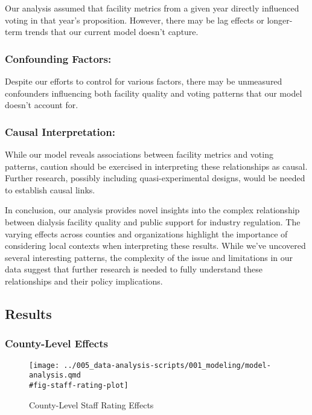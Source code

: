 \documentclass[
  11pt,
  letterpaper,
  DIV=11,
  numbers=noendperiod]{scrartcl}
\begin{document}
Our analysis assumed that facility metrics from a given year directly
influenced voting in that year's proposition. However, there may be lag
effects or longer-term trends that our current model doesn't capture.

\subsubsection{Confounding Factors:}\label{confounding-factors}

Despite our efforts to control for various factors, there may be
unmeasured confounders influencing both facility quality and voting
patterns that our model doesn't account for.

\subsubsection{Causal Interpretation:}\label{causal-interpretation}

While our model reveals associations between facility metrics and voting
patterns, caution should be exercised in interpreting these
relationships as causal. Further research, possibly including
quasi-experimental designs, would be needed to establish causal links.

In conclusion, our analysis provides novel insights into the complex
relationship between dialysis facility quality and public support for
industry regulation. The varying effects across counties and
organizations highlight the importance of considering local contexts
when interpreting these results. While we've uncovered several
interesting patterns, the complexity of the issue and limitations in our
data suggest that further research is needed to fully understand these
relationships and their policy implications.

\subsection{Results}\label{results}

\subsubsection{County-Level Effects}\label{county-level-effects}

\begin{figure}[H]

{\centering \texttt{[image: ../005\_data-analysis-scripts/001\_modeling/model-analysis.qmd\\\#fig-staff-rating-plot]}

}

\caption{County-Level Staff Rating Effects}

\end{figure}%
\end{document}

